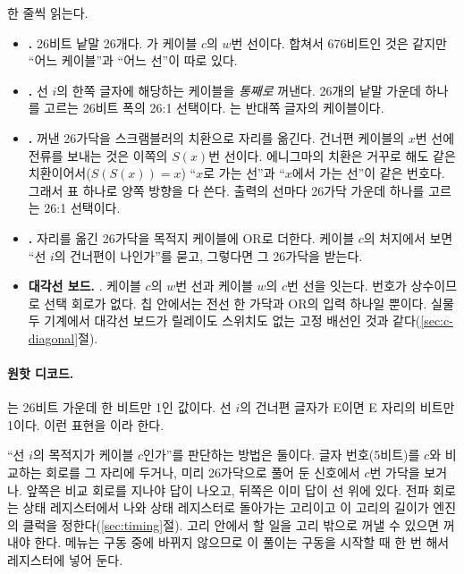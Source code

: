한 줄씩 읽는다.

\begin{itemize}
\item \textbf{.} 26비트 낱말 26개다. 가 케이블 $c$의 $w$번 선이다. 합쳐서
676비트인 것은 같지만 ``어느 케이블''과 ``어느 선''이 따로 있다.
\item \textbf{.} 선 $i$의 한쪽 글자에 해당하는 케이블을 \emph{통째로} 꺼낸다.
26개의 낱말 가운데 하나를 고르는 26비트 폭의 26:1 선택이다. 는 반대쪽 글자의 케이블이다.
\item \textbf{.} 꺼낸 26가닥을 스크램블러의 치환으로 자리를 옮긴다.
건너편 케이블의 $x$번 선에 전류를 보내는 것은 이쪽의 $S(x)$번 선이다. 에니그마의 치환은 거꾸로 해도 같은
치환이어서($S(S(x)) = x$) ``$x$로 가는 선''과 ``$x$에서 가는 선''이 같은 번호다. 그래서 표 하나로 양쪽
방향을 다 쓴다. 출력의 선마다 26가닥 가운데 하나를 고르는 26:1 선택이다.
\item \textbf{.} 자리를 옮긴 26가닥을 목적지 케이블에 OR로 더한다. 케이블 $c$의
처지에서 보면 ``선 $i$의 건너편이 나인가''를 묻고, 그렇다면 그 26가닥을 받는다.
\item \textbf{대각선 보드.} . 케이블 $c$의 $w$번 선과 케이블 $w$의 $c$번
선을 잇는다. 번호가 상수이므로 선택 회로가 없다. 칩 안에서는 전선 한 가닥과 OR의 입력 하나일 뿐이다.
실물 두 기계에서 대각선 보드가 릴레이도 스위치도 없는 고정 배선인 것과 같다(\ref{sec:c-diagonal}절).
\end{itemize}

\paragraph{원핫 디코드.} 는 26비트 가운데 한 비트만 1인 값이다. 선 $i$의 건너편 글자가
E이면 E 자리의 비트만 1이다. 이런 표현을 이라 한다.

\Why ``선 $i$의 목적지가 케이블 $c$인가''를 판단하는 방법은 둘이다. 글자 번호(5비트)를 $c$와 비교하는
회로를 그 자리에 두거나, 미리 26가닥으로 풀어 둔 신호에서 $c$번 가닥을 보거나. 앞쪽은 비교 회로를 지나야
답이 나오고, 뒤쪽은 이미 답이 선 위에 있다. 전파 회로는 상태 레지스터에서 나와 상태 레지스터로 돌아가는
고리이고 이 고리의 길이가 엔진의 클럭을 정한다(\ref{sec:timing}절). 고리 안에서 할 일을 고리 밖으로 꺼낼 수
있으면 꺼내야 한다. 메뉴는 구동 중에 바뀌지 않으므로 이 풀이는 구동을 시작할 때 한 번 해서 레지스터에
넣어 둔다.

